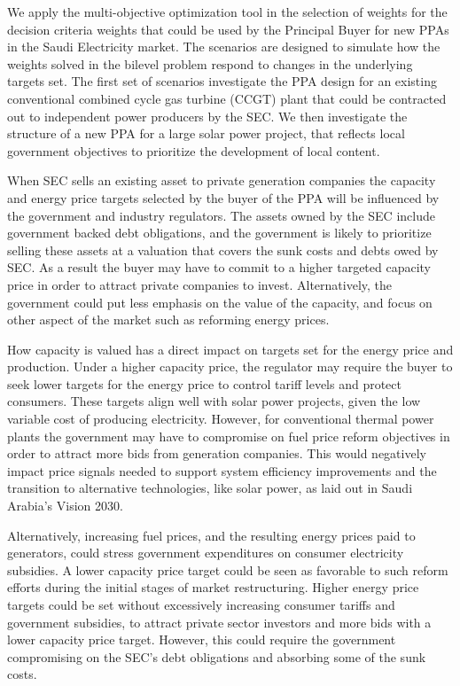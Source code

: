 \documentclass[informs]{informs3}
\begin{document}
We apply the multi-objective optimization tool in the selection of weights for the decision criteria weights that could be used by the Principal Buyer for new PPAs in the Saudi Electricity market. The scenarios are designed to simulate how the weights solved in the bilevel problem respond to changes in the underlying targets set.  The first set of scenarios investigate the PPA design for an existing conventional combined cycle gas turbine (CCGT) plant that could be contracted out to independent power producers by the SEC. We then investigate the structure of a new PPA for a large solar power project, that reflects local government objectives to prioritize the development of local content. 

When SEC sells an existing asset to private generation companies the  capacity and energy price targets selected by the buyer of the PPA will be influenced by the government and industry regulators. The assets owned by the SEC include government backed debt obligations, and the government is likely to prioritize selling these assets at a valuation that covers the sunk costs and debts owed by SEC. As a result the buyer may have to commit to a higher targeted capacity price in order to attract private companies to invest. Alternatively, the government could put less emphasis on the value of the capacity, and focus on other aspect of the market such as reforming energy prices.
 
How capacity is valued has a direct impact on targets set for the energy price and production. Under a higher capacity price, the regulator may require the buyer to seek lower targets for the energy price to control tariff levels and protect consumers. These targets align well with solar power projects, given the low variable cost of producing electricity. However, for conventional thermal power plants the government may have to compromise on fuel price reform objectives in order to attract more bids from generation companies. This would negatively impact price signals needed to support system efficiency improvements and the transition to alternative technologies, like solar power, as laid out in Saudi Arabia’s Vision 2030. 

Alternatively, increasing fuel prices, and the resulting energy prices paid to generators, could stress government expenditures on consumer electricity subsidies. A lower capacity price target could be seen as favorable to such reform efforts during the initial stages of market restructuring. Higher energy price targets could be set without excessively increasing consumer tariffs and government subsidies, to attract private sector investors and more bids with a lower capacity price target. However, this could require the government compromising on the SEC’s debt obligations and absorbing some of the sunk costs.
\end{document}
